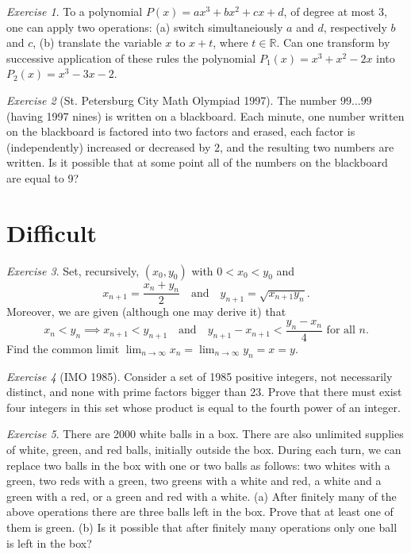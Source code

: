 \documentclass{article}
\theoremstyle{definition}
\theoremstyle{remark}
\newtheorem{exercise}{Exercise}
\newcommand{\RR}{\mathbb{R}}
\newcommand{\isp}[1]{\quad\text{#1}\quad}
\begin{document}
    \begin{exercise}
        To a polynomial \(P(x)=ax^3+bx^2+cx+d\), of degree at most 3, one can apply two operations: (a) switch simultaneiously \(a\) and \(d\), respectively \(b\) and \(c\), (b) translate the variable \(x\) to \(x+t\), where \(t\in\RR\). Can one transform by successive application of these rules the polynomial \(P_1(x)=x^3+x^2-2x\) into \(P_2(x)=x^3-3x-2\). 
    \end{exercise}

    \begin{exercise}[St. Petersburg City Math Olympiad 1997]
        The number \(99\ldots99\) (having 1997 nines) is written on a blackboard. Each minute, one number written on the blackboard is factored into two factors and erased, each factor is (independently) increased or decreased by \(2\), and the resulting two numbers are written. Is it possible that at some point all of the numbers on the blackboard are equal to 9?
    \end{exercise}

\section{Difficult}

    \begin{exercise}
        Set, recursively, \((x_0,y_0)\) with \(0<x_0<y_0\) and
        \[x_{n+1}=\frac{x_n+y_n}{2}\isp{and}y_{n+1}=\sqrt{x_{n+1}y_n}.\]
        Moreover, we are given (although one may derive it) that
        \[x_n<y_n\implies x_{n+1}<y_{n+1}\isp{and}y_{n+1}-x_{n+1}<\frac{y_n-x_n}{4}\text{ for all }n.\]
        Find the common limit \(\displaystyle\lim_{n\to\infty}x_n=\lim_{n\to\infty}y_n=x=y\).
    \end{exercise}

    \begin{exercise}[IMO 1985]
        Consider a set of 1985 positive integers, not necessarily distinct, and none with prime factors bigger than 23. Prove that there must exist four integers in this set whose product is equal to the fourth power of an integer.
    \end{exercise}

    \begin{exercise}
        There are 2000 white balls in a box. There are also unlimited supplies of white, green, and red balls, initially outside the box. During each turn, we can replace two balls in the box with one or two balls as follows: two whites with a green, two reds with a green, two greens with a white and red, a white and a green with a red, or a green and red with a white. (a) After finitely many of the above operations there are three balls left in the box. Prove that at least one of them is green. (b) Is it possible that after finitely many operations only one ball is left in the box?
    \end{exercise}
    
\end{document}
